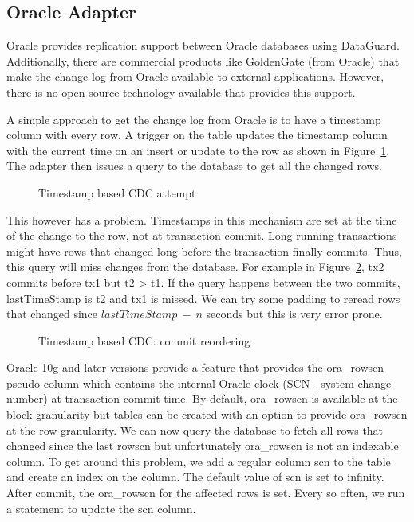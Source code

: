 \subsection{Oracle Adapter}

Oracle provides replication support between Oracle databases using DataGuard. Additionally, there are commercial products like GoldenGate (from Oracle) that make the change log from Oracle available to external applications. However, there is no open-source technology available that provides this support.

A simple approach to get the change log from Oracle is to have a timestamp column with every row. A trigger on the table updates the timestamp column with the current time on an insert or update to the row as shown in Figure~\ref{fig:Tablewithtimestamp}. The adapter then issues a query to the database to get all the changed rows.

\begin{figure}
\centering
{}
\vspace*{-2ex}
\caption{Timestamp based CDC attempt}
\label{fig:Tablewithtimestamp}
\vspace*{-2ex}
\end{figure}

This however has a problem. Timestamps in this mechanism are set at the time of the change to the row, not at transaction commit. Long running transactions might have rows that changed long before the transaction finally commits. Thus, this query will miss changes from the database. For example in Figure~\ref{fig:tx1tx2}, tx2 commits before tx1 but t2 > t1. If the query happens between the two commits, lastTimeStamp is t2 and tx1 is missed. We can try some padding to reread rows that changed since $lastTimeStamp~-~n$ seconds but this is very error prone.

\begin{figure}
\centering
{}
\vspace*{-2ex}
\caption{Timestamp based CDC: commit reordering}
\label{fig:tx1tx2}
\vspace*{-2ex}
\end{figure}
Oracle 10g and later versions provide a feature that provides the ora\_rowscn pseudo column which contains the internal Oracle clock (SCN - system change number) at transaction commit time. By default, ora\_rowscn is available at the block granularity but tables can be created with an option to provide ora\_rowscn at the row granularity. We can now query the database to fetch all rows that changed since the last rowscn but unfortunately ora\_rowscn is not an indexable column. To get around this problem, we add a regular column scn to the table and create an index on the column. The default value of scn is set to infinity. After commit, the ora\_rowscn for the affected rows is set. Every so often, we run a statement to update the scn column.

